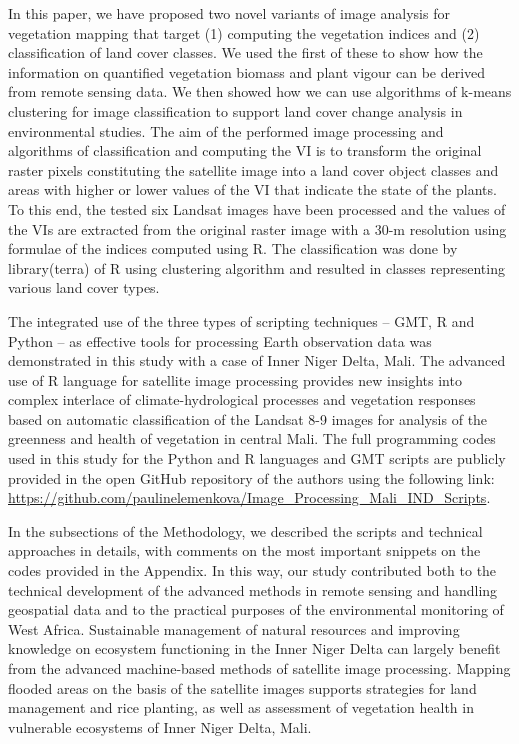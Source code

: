 \documentclass[12pt,a4paper,oneside]{article}
\def \newpar{\vspace{6pt}}
\begin{document}
\newpar In this paper, we have proposed two novel variants of image analysis for vegetation mapping that target (1) computing the vegetation indices and (2) classification of land cover classes. We used the first of these to show how the information on quantified vegetation biomass and plant vigour can be derived from remote sensing data. We then showed how we can use algorithms of k-means clustering for image classification to support land cover change analysis in environmental studies. The aim of the performed image processing and algorithms of classification and computing the VI is to transform the original raster pixels constituting the satellite image into a land cover object classes and areas with higher or lower values of the VI that indicate the state of the plants. To this end, the tested six Landsat images have been processed and the values of the VIs are extracted from the original raster image with a 30-m resolution using formulae of the indices computed using R. The classification was done by library(terra) of R using clustering algorithm and resulted in classes representing various land cover types.

\newpar The integrated use of the three types of scripting techniques -- GMT, R and Python -- as effective tools for processing Earth observation data was demonstrated in this study with a case of Inner Niger Delta, Mali. The advanced use of R language for satellite image processing provides new insights into complex interlace of climate-hydrological processes and vegetation responses based on automatic classification of the Landsat 8-9 images for analysis of the greenness and health of vegetation in central Mali. The full programming codes used in this study for the Python and R languages and GMT scripts are publicly provided in the open GitHub repository of the authors using the following link: \href{https://github.com/paulinelemenkova/Image_Processing_Mali_IND_Scripts}{https://github.com/paulinelemenkova/Image\_Processing\_Mali\_IND\_Scripts}. 

\newpar In the subsections of the Methodology, we described the scripts and technical approaches in details, with comments on the most important snippets on the codes provided in the Appendix. In this way, our study contributed both to the technical development of the advanced methods in remote sensing and handling geospatial data and to the practical purposes of the environmental monitoring of West Africa. Sustainable management of natural resources and improving knowledge on ecosystem functioning in the Inner Niger Delta can largely benefit from the advanced machine-based methods of satellite image processing. Mapping flooded areas on the basis of the satellite images supports strategies for land management and rice planting, as well as assessment of vegetation health in vulnerable ecosystems of Inner Niger Delta, Mali. 
\end{document}
